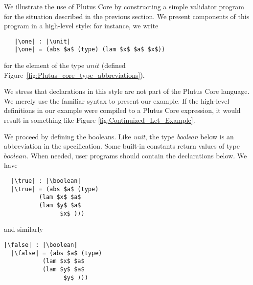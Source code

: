 \documentclass[../plutus-core-specification.tex]{subfiles}
\begin{document}
\newcommand\unit{$\mathit{unit}$}
\newcommand\one{$\mathit{one}$}
\newcommand\boolean{$\mathit{boolean}$}
\newcommand\true{$\mathit{true}$}
\newcommand\false{$\mathit{false}$}
\newcommand\case{$\mathit{case}$}
\newcommand\signed{$\mathit{signed}$}
\newcommand\txhash{$\mathit{txhash}$}
\newcommand\pubkey{$\mathit{pubkey}$}
\newcommand\blocknum{$\mathit{blocknum}$}


We illustrate the use of Plutus Core by constructing a simple
validator program for the situation described in the previous
section. We present components of this program in a high-level style:
for instance, we write
\begin{lstlisting}
   |\one| : |\unit|
   |\one| = (abs $a$ (type) (lam $x$ $a$ $x$))
\end{lstlisting}
for the element of the type $unit$ (defined Figure~\ref{fig:Plutus_core_type_abbreviations}).

We stress that declarations in this style are not part of the Plutus
Core language. We merely use the familiar syntax to present our
example. If the high-level definitions in our example were compiled to
a Plutus Core expression, it would result in something like Figure
\ref{fig:Continuized_Let_Example}.

We proceed by defining the booleans. Like \textit{unit}, the type \textit{boolean}
below is an abbreviation in the specification. Some built-in constants
return values of type $boolean$. When needed, user programs should
contain the declarations below. We have


\begin{lstlisting}
  |\true| : |\boolean|
  |\true| = (abs $a$ (type)
          (lam $x$ $a$
          (lam $y$ $a$
                $x$ )))
\end{lstlisting}
and similarly
\begin{lstlisting}[basicstyle=\ttfamily,mathescape]
  |\false| : |\boolean|
  |\false| = (abs $a$ (type)
           (lam $x$ $a$
           (lam $y$ $a$
                 $y$ )))
\end{lstlisting}
\end{document}
